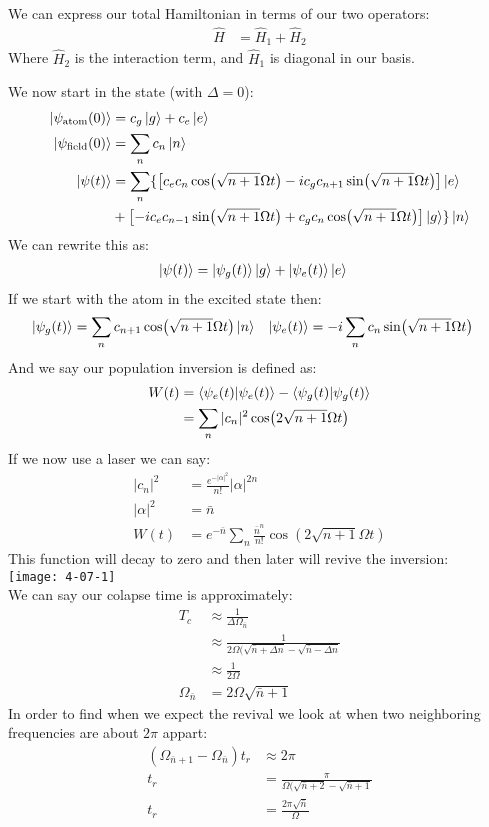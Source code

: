 
We can express our total Hamiltonian in terms of our two operators:
\begin{align*}
	\hat{H} &= \hat{H}_1 + \hat{H}_2
\end{align*}
Where $\hat{H}_2$ is the interaction term, and $\hat{H}_1$ is diagonal in our basis.

We now start in the state (with $\Delta = 0$):
\begin{align*}
	\ket{\psi_\text{atom}(0)} &= c_g\ket{g} + c_e\ket{e} \\
	\ket{\psi_\text{field}(0)} &= \sum_n c_n \ket{n} \\
	\ket{\psi(t)} &= \sum_n \{\left[c_ec_n\cos(\sqrt{n+1}\Omega t) - ic_gc_{n+1}\sin(\sqrt{n+1}\Omega t)\right]\ket{e} \\
				&+ \left[-ic_ec_{n-1}\sin(\sqrt{n+1}\Omega t) + c_gc_n\cos(\sqrt{n+1}\Omega t)\right]\ket{g}\}\ket{n}
\end{align*}
We can rewrite this as:
\begin{align*}
	\ket{\psi(t)} &= \ket{\psi_g(t)}\ket{g} + \ket{\psi_e(t)}\ket{e}
\end{align*}
If we start with the atom in the excited state then:
\begin{align*}
	\ket{\psi_g(t)} &= \sum_n c_{n+1} \cos(\sqrt{n+1}\Omega t) \ket{n} &  \ket{\psi_e(t)} &= -i\sum_n c_n \sin(\sqrt{n+1}\Omega t)
\end{align*}
And we say our population inversion is defined as:
\begin{align*}
	W(t) &= \bra{\psi_e(t)}\ket{\psi_e(t)} - \bra{\psi_g(t)}\ket{\psi_g(t)} \\
	&= \sum_n |c_n|^2\cos(2\sqrt{n+1}\Omega t)
\end{align*}
If we now use a laser we can say:
\begin{align*}
	|c_n|^2 &= \frac{e^{-|\alpha|^2}}{n!} |\alpha|^{2n} \\
	|\alpha|^2 &= \bar{n} \\
	W(t) &= e^{-\bar{n}} \sum_n \frac{\bar{n}^n}{n!} \cos(2\sqrt{n+1}\Omega t)
\end{align*}
This function will decay to zero and then later will revive the inversion:\\
\texttt{[image: 4-07-1]}\\
We can say our colapse time is approximately:
\begin{align*}
	T_c &\approx \frac{1}{\Delta\Omega_{\bar{n}}} \\
	    &\approx \frac{1}{2\Omega(\sqrt{\bar{n} + \Delta n} - \sqrt{\bar{n} - \Delta n}} \\
	    &\approx \frac{1}{2\Omega} \\
	\Omega_{\bar{n}} &= 2\Omega\sqrt{\bar{n} +1}
\end{align*}
In order to find when we expect the revival we look at when two neighboring frequencies are about $2\pi$ appart:
\begin{align*}
	(\Omega_{\bar{n}+1} - \Omega_{\bar{n}})t_r &\approx 2\pi \\
	t_r &= \frac{\pi}{\Omega(\sqrt{\bar{n}+2} - \sqrt{\bar{n}+1}} \\
	t_r &= \frac{2\pi\sqrt{\bar{n}}}{\Omega}
\end{align*}

